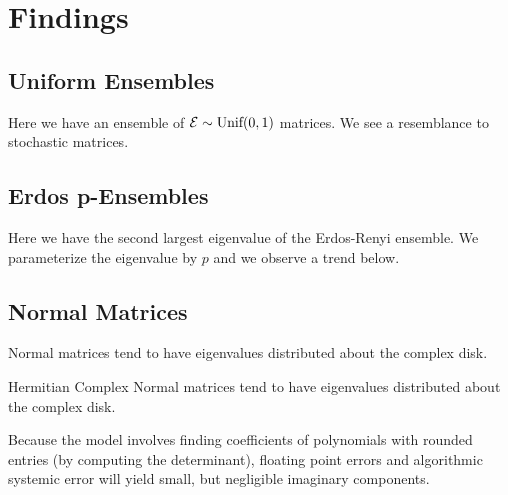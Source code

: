 \section{Findings}
\subsection{Uniform Ensembles}
Here we have an ensemble of $\mathcal{E} \sim \text{Unif}(0,1)$ matrices. We see a resemblance to
stochastic matrices.

\newpage

\subsection{Erdos p-Ensembles}

Here we have the second largest eigenvalue of the Erdos-Renyi ensemble. We parameterize the eigenvalue by $p$ and we observe a trend below.


\newpage
\subsection{Normal Matrices}

Normal matrices tend to have eigenvalues distributed about the complex disk.



Hermitian Complex Normal matrices tend to have eigenvalues distributed about the complex disk.

\begin{remark}
Because the model involves finding coefficients of polynomials with rounded entries (by computing the determinant), floating point errors and algorithmic systemic error will yield small, but negligible imaginary components.
\end{remark}

